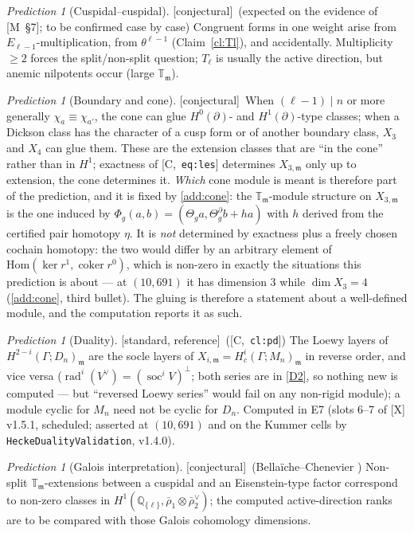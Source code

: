 \documentclass[11pt]{article}
\theoremstyle{remark}
\newtheorem{prediction}[theorem]{Prediction}
\newcommand{\Q}{\mathbb{Q}}
\newcommand{\Hom}{\mathrm{Hom}}
\newcommand{\Ga}{\Gamma}
\DeclareMathOperator{\soc}{soc}
\DeclareMathOperator{\rad}{rad}
\DeclareMathOperator{\coker}{coker}
\newcommand{\T}{\mathbb{T}}
\newcommand{\m}{\mathfrak{m}}
\newcommand{\Mn}{M_n}
\newcommand{\Dn}{D_n}
\newcommand{\HA}[1]{[C,~\texttt{#1}]}      %
\newcommand{\Mnote}[1]{[M~\S#1]}            %
\newcommand{\STD}{\textsf{[standard, reference]}}
\newcommand{\CONJ}{\textsf{[conjectural]}}
\begin{document}
\begin{prediction}[Cuspidal--cuspidal]\label{pr:cuspcusp}\CONJ\ (expected on the evidence of \Mnote{7}; to be confirmed case by case)
Congruent forms in one weight arise from $E_{\ell-1}$-multiplication, from $\theta^{\ell-1}$
(Claim~\ref{cl:Tl}), and accidentally. Multiplicity $\ge2$ forces the split/non-split
question; $T_\ell$ is usually the active direction, but anemic nilpotents occur (large
$\T_\m$).
\end{prediction}

\begin{prediction}[Boundary and cone]\label{pr:cone}\CONJ\
When $(\ell-1)\mid n$ or more generally $\chi_a\equiv\chi_{a'}$, the cone can glue
$H^0(\partial)$- and $H^1(\partial)$-type classes; when a Dickson class has the character of a
cusp form or of another boundary class, $X_3$ and $X_4$ can glue them. These are the extension
classes that are ``in the cone'' rather than in $H^1$; exactness of \HA{eq:les} determines
$X_{3,\m}$ only up to extension, the cone determines it. \emph{Which} cone module is meant is
therefore part of the prediction, and it is fixed by \ref{add:cone}: the $\T_\m$-module structure on
$X_{3,\m}$ is the one induced by $\Phi_g(a,b)=(\Theta_g a,\Theta^\partial_g b+ha)$ with $h$ derived
from the certified pair homotopy $\eta$. It is \emph{not} determined by exactness plus a freely
chosen cochain homotopy: the two would differ by an arbitrary element of $\Hom(\ker r^1,\coker r^0)$,
which is non-zero in exactly the situations this prediction is about --- at $(10,691)$ it has
dimension $3$ while $\dim X_3=4$ (\ref{add:cone}, third bullet). The gluing is therefore a statement about
a well-defined module, and the computation reports it as such.
\end{prediction}

\begin{prediction}[Duality]\label{pr:dual}\STD\ (\HA{cl:pd})
The Loewy layers of $H^{2-i}(\Ga;\Dn)_\m$ are the socle layers of $X_{i,\m}=H^i_c(\Ga;\Mn)_\m$
in reverse order, and vice versa ($\rad^i(V^\vee)=(\soc^iV)^\perp$; both series are in
\ref{D2}, so nothing new is computed --- but ``reversed Loewy series'' would fail on any
non-rigid module); a module cyclic for $\Mn$ need not be cyclic for $\Dn$. Computed in E7
(slots 6--7 of [X] v1.5.1, scheduled; asserted at $(10,691)$ and on the Kummer cells by
\texttt{HeckeDualityValidation}, v1.4.0).
\end{prediction}

\begin{prediction}[Galois interpretation]\label{pr:galois}\CONJ\ (Bella\"iche--Chenevier \cite{bc})
Non-split $\T_\m$-extensions between a cuspidal and an Eisenstein-type factor correspond to
non-zero classes in $H^1(\Q_{\{\ell\}},\bar\rho_1\otimes\bar\rho_2^\vee)$; the computed
active-direction ranks are to be compared with those Galois cohomology dimensions.
\end{prediction}
\end{document}
